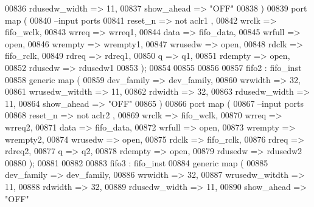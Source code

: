\begin{DoxyCode}
00836             rdusedw_width   => \textcolor{vhdllogic}{11},
00837             show_ahead      => \textcolor{keyword}{"OFF"}
00838   \textcolor{vhdlchar}{)}  
00839   \textcolor{keywordflow}{port} \textcolor{keywordflow}{map} (
00840 \textcolor{keyword}{      --input ports }
00841       reset_n       => \textcolor{keywordflow}{not} aclr1 , 
00842       wrclk         => fifo_wclk,
00843       wrreq         => wrreq1,
00844       data          => fifo_data, 
00845       wrfull        => \textcolor{keywordflow}{open},
00846         wrempty       => wrempty1, 
00847       wrusedw       => \textcolor{keywordflow}{open},
00848       rdclk          => fifo_rclk,
00849       rdreq         => rdreq1,
00850       q             => q1,
00851       rdempty       => \textcolor{keywordflow}{open},
00852       rdusedw       => rdusedw1     
00853         \textcolor{vhdlchar}{)};
00854   
00855   
00856   
00857       fifo2 :  fifo_inst 
00858   \textcolor{keywordflow}{generic} \textcolor{keywordflow}{map} (
00859             dev_family      => dev_family, 
00860             wrwidth         => \textcolor{vhdllogic}{32}, 
00861             wrusedw_witdth  => \textcolor{vhdllogic}{11}, 
00862             rdwidth         => \textcolor{vhdllogic}{32}, 
00863             rdusedw_width   => \textcolor{vhdllogic}{11},
00864             show_ahead      => \textcolor{keyword}{"OFF"}
00865   \textcolor{vhdlchar}{)}  
00866   \textcolor{keywordflow}{port} \textcolor{keywordflow}{map} (
00867 \textcolor{keyword}{      --input ports }
00868       reset_n       => \textcolor{keywordflow}{not} aclr2 , 
00869       wrclk         => fifo_wclk,
00870       wrreq         => wrreq2,
00871       data          => fifo_data, 
00872       wrfull        => \textcolor{keywordflow}{open},
00873         wrempty       => wrempty2, 
00874       wrusedw       => \textcolor{keywordflow}{open},
00875       rdclk          => fifo_rclk,
00876       rdreq         => rdreq2,
00877       q             => q2,
00878       rdempty       => \textcolor{keywordflow}{open},
00879       rdusedw       => rdusedw2     
00880         \textcolor{vhdlchar}{)};
00881 
00882 
00883     fifo3 :  fifo_inst 
00884   \textcolor{keywordflow}{generic} \textcolor{keywordflow}{map} (
00885             dev_family      => dev_family, 
00886             wrwidth         => \textcolor{vhdllogic}{32}, 
00887             wrusedw_witdth  => \textcolor{vhdllogic}{11}, 
00888             rdwidth         => \textcolor{vhdllogic}{32}, 
00889             rdusedw_width   => \textcolor{vhdllogic}{11},
00890             show_ahead      => \textcolor{keyword}{"OFF"}

\end{DoxyCode}
